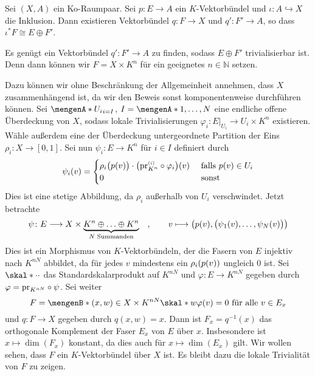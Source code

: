 \begin{lemma}[label=sub:38,{name=[Isomorphie eines Pullbackbündels für Ko-Raumpaare]}]
Sei $(X,A)$ ein Ko-Raumpaar. Sei $p \colon E \to A$ ein $K$-Vektorbündel und $\iota \colon A \hookrightarrow X$ die Inklusion. Dann existieren Vektorbündel $q \colon F \to X$
und $q' \colon F' \to A$, so dass $\iota^* F \cong E \oplus F'$.	
\end{lemma}
\begin{beweis}
Es genügt ein Vektorbündel $q' \colon F' \to A $ zu finden, sodass $E \oplus F'$ trivialisierbar ist. 
Denn dann können wir $F = X \times K^n$ für ein geeignetes $n \in \mathds{N}$ setzen.

Dazu können wir ohne Beschränkung der Allgemeinheit annehmen, dass $X$ zusammenhängend ist, da wir den Beweis sonst komponentenweise durchführen können. Sei 
$\set{U_i}_{i=I}$, $I=\set{1,\ldots,N}$ eine endliche offene Überdeckung von $X$, sodass lokale Trivialisierungen $\varphi_i \colon E|_{U_i} \to U_i \times K^n$ existieren. 
Wähle außerdem eine der Überdeckung untergeordnete Partition der Eins $\rho_i \colon X \to [0,1]$. Sei nun $\psi_i \colon E \to K^n$ für $i \in I$ definiert durch
\[
	\psi_i(v) = \begin{cases}
		\rho_i \enbrace[\big]{p(v)} \cdot \enbrace*{\pr_{K^n}^\ssbrace{i} \circ \varphi_i}(v) &\text{ falls }p(v) \in U_i\\
		0 &\text{ sonst}
	\end{cases}
\]
Dies ist eine stetige Abbildung, da $\rho_i$ außerhalb von $U_i$ verschwindet. Jetzt betrachte
\[
	\psi \colon E \longrightarrow X \times \Underbrace{K^n \oplus \ldots \oplus K^n}{N \text{ Summanden}} \quad , \qquad v \longmapsto 
	\enbrace[\big]{p(v), \enbrace[\big]{\psi_1(v), \ldots , \psi_N(v)} } 
\]
Dies ist ein Morphismus von $K$-Vektorbündeln, der die Fasern von $E$ injektiv nach $K^{nN}$ abbildet, da für jedes $v$ mindestens ein $\rho_i \enbrace*{p(v)}$ ungleich $0$
ist. Sei $\skal*{\cdot}{\cdot}$ das Standardskalarprodukt auf $K^{nN}$ und $\varphi \colon E \to K^{nN}$ gegeben durch $\varphi= \pr_{K^{nN}} \circ \psi$. Sei weiter
\[
	F = \set[(x,w) \in X \times K^{nN}]{\skal*{w}{\varphi(v)}=0 \text{ für alle } v \in E_x} 
\]
und $q \colon F \to X$ gegeben durch $q(x,w)=x$. Dann ist $F_x = q ^{-1}(x)$ das orthogonale Komplement der Faser $E_x$ von $E$ über $x$. Insbesondere ist 
$x \mapsto \dim(F_x)$ konstant, da dies auch für $x \mapsto \dim(E_x)$ gilt. Wir wollen sehen, dass $F$ ein $K$-Vektorbündel über $X$ ist. Es bleibt dazu die lokale 
Trivialität von $F$ zu zeigen.


\end{beweis}

